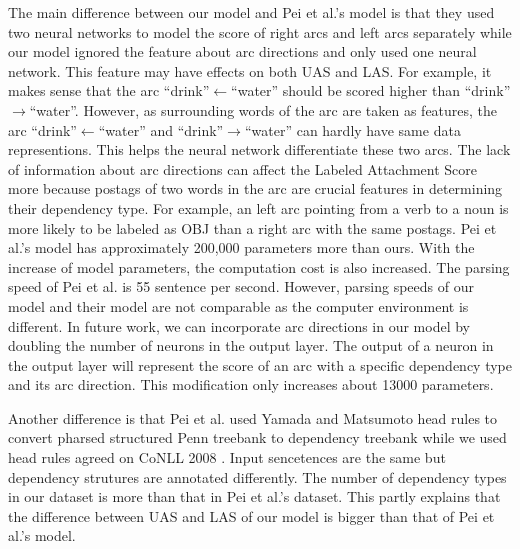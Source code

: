 The main difference between our model and Pei et al.'s model is that they used two neural networks to model the score of right arcs and left arcs separately while our model ignored the feature about arc directions and only used one neural network. This feature may have effects on both UAS and LAS. For example, it makes sense that the arc ``drink''$\leftarrow$``water'' should be scored higher than ``drink''$\rightarrow$``water''. However, as surrounding words of the arc are taken as features, the arc ``drink''$\leftarrow$``water'' and ``drink''$\rightarrow$``water'' can hardly have same data representions. This helps the neural network differentiate these two arcs. The lack of information about arc directions can affect the Labeled Attachment Score more because postags of two words in the arc are crucial features in determining their dependency type. For example, an left arc pointing from a verb to a noun is more likely to be labeled as OBJ than a right arc with the same postags. Pei et al.'s model has approximately 200,000 parameters more than ours. With the increase of model parameters, the computation cost is also increased. The parsing speed of Pei et al. is 55 sentence per second. However, parsing speeds of our model and their model are not comparable as the computer environment is different.
In future work, we can incorporate arc directions in our model by doubling the number of neurons in the output layer. The output of a neuron in the output layer will represent the score of an arc with a specific dependency type and its arc direction. This modification only increases about 13000 parameters.   

Another difference is that Pei et al. used Yamada and Matsumoto \cite{yamada2003statistical} head rules to convert pharsed structured Penn treebank to dependency treebank while we used head rules agreed on CoNLL 2008 \cite{surdeanu2008conll}. Input sencetences are the same but dependency strutures are annotated differently. The number of dependency types in our dataset is more than that in Pei et al.'s dataset. This partly explains that the difference between UAS and LAS of our model is bigger than that of Pei et al.'s model.  






